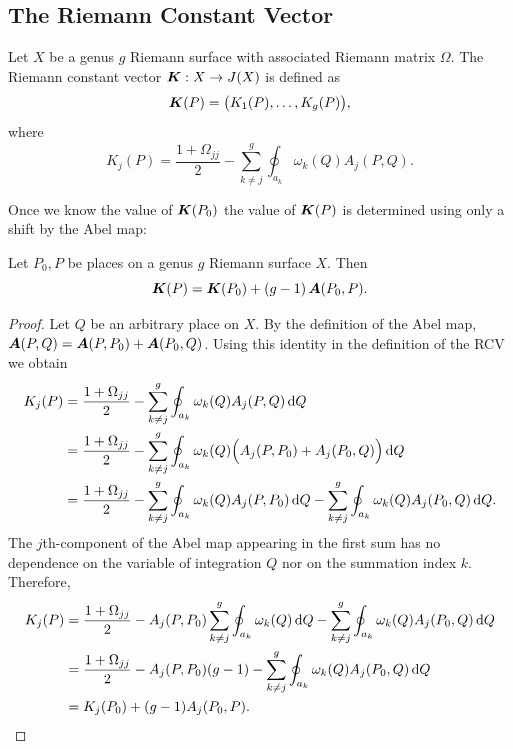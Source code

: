 \subsection{The Riemann Constant
  Vector}\label{subsec:background-the-riemann-constant-vector}

\begin{definition} \label{def:rcv}
Let $X$ be a genus $g$ Riemann surface with associated Riemann matrix
$\Omega$. The Riemann constant vector $\operatorname{\boldsymbol{K}} : X \to J(X)$ is defined as
\begin{equation} \label{eqn:rcv1}
  \operatorname{\boldsymbol{K}}(P) = \big( K_1(P), \ldots, K_g(P) \big),
\end{equation}
where
\begin{equation} \label{eqn:rcv2}
  K_j(P) = \frac{1 + \Omega_{jj}}{2} - \sum_{k \neq j}^g
           \oint_{a_k} \omega_k(Q) A_j(P,Q).
\end{equation}
\end{definition}
Once we know the value of $\operatorname{\boldsymbol{K}}(P_0)$ the value of $\operatorname{\boldsymbol{K}}(P)$ is
determined using only a shift by the Abel map:
\begin{theorem} \label{thm:RCVshift}
  Let $P_0,P$ be places on a genus $g$ Riemann surface $X$. Then
  \begin{equation} \label{eqn:RCVshift}
    \operatorname{\boldsymbol{K}}(P) = \operatorname{\boldsymbol{K}}(P_0) + (g-1)\operatorname{\boldsymbol{A}}(P_0,P).
  \end{equation}
\end{theorem}
\begin{proof}
Let $Q$ be an arbitrary place on $X$. By the definition of the Abel map,
$\operatorname{\boldsymbol{A}}(P,Q) = \operatorname{\boldsymbol{A}}(P,P_0) + \operatorname{\boldsymbol{A}}(P_0,Q)$. Using this identity in the
definition of the RCV we obtain
\begin{align} \label{eqn:RCVshift1}
  K_j(P)
  &=
  \frac{1 + \Omega_{jj}}{2}
  -
  \sum_{k \neq j}^g
  \oint_{a_k} \omega_k(Q) A_j(P,Q) \,\mathrm{d}Q  \notag \\
  &=
  \frac{1 + \Omega_{jj}}{2}
  -
  \sum_{k \neq j}^g
  \oint_{a_k} \omega_k(Q) \Big( A_j(P,P_0) + A_j(P_0,Q) \Big) \,\mathrm{d}Q  \notag \\
  &=
  \frac{1 + \Omega_{jj}}{2}
  -
  \sum_{k \neq j}^g
  \oint_{a_k} \omega_k(Q) A_j(P,P_0) \,\mathrm{d}Q
  -
  \sum_{k \neq j}^g
  \oint_{a_k} \omega_k(Q) A_j(P_0,Q) \,\mathrm{d}Q.
\end{align}
The $j$th-component of the Abel map appearing in the first sum has no
dependence on the variable of integration $Q$ nor on the summation index
$k$. Therefore,
\begin{align} \label{eqn:RCVshift2}
  K_j(P)
  &=
  \frac{1 + \Omega_{jj}}{2}
  -
  A_j(P,P_0)
  \sum_{k \neq j}^g
  \oint_{a_k} \omega_k(Q) \,\mathrm{d}Q
  -
  \sum_{k \neq j}^g
  \oint_{a_k} \omega_k(Q) A_j(P_0,Q) \,\mathrm{d}Q \notag \\
  &=
  \frac{1 + \Omega_{jj}}{2}
  -
  A_j(P,P_0) (g-1)
  -
  \sum_{k \neq j}^g
  \oint_{a_k} \omega_k(Q) A_j(P_0,Q) \,\mathrm{d}Q \notag \\
  &=
  K_j(P_0) + (g-1)A_j(P_0,P).
\end{align}
\end{proof}
